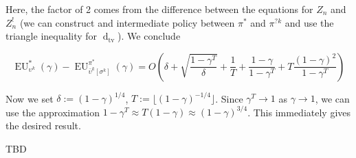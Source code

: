 \documentclass[a4paper]{article}
\newcommand{\Dtv}{\operatorname{d}_{\text{tv}}}
\newcommand{\Floor}[1]{\lfloor #1 \rfloor}
\newcommand{\EU}{\operatorname{EU}}
\begin{document}
Here, the factor of 2 comes from the difference between the equations for $Z_n$ and $Z^!_n$ (we can construct and intermediate policy between $\pi^*$ and $\pi^{?k}$ and use the triangle inequality for $\Dtv$). We conclude

$$\EU^*_{\upsilon^k}(\gamma)-\EU^{\pi^{*}}_{\bar{\upsilon}^k[\sigma^k]}(\gamma) = O\left(\delta+\sqrt{\frac{1-\gamma^T}{\delta}} +\frac{1}{T}+\frac{1-\gamma}{1-\gamma^T}+T\frac{(1-\gamma)^2}{1-\gamma^T}\right)$$

Now we set $\delta:=\left(1-\gamma\right)^{1/4}$,  $T:=\Floor{\left(1-\gamma\right)^{-1/4}}$. Since $\gamma^T \rightarrow 1$ as $\gamma \rightarrow 1$, we can use the approximation $1-\gamma^T \approx T(1-\gamma) \approx (1-\gamma)^{3/4}$. This immediately gives the desired result.

TBD
\end{document}
